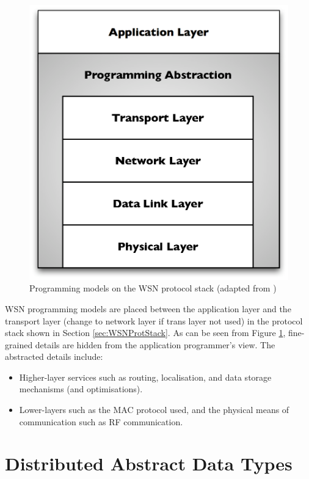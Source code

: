 \begin{figure}
\centering
\label{Fig:ProtStack_ProgAbstr}
\includegraphics[scale=0.6]{img/ProtStack_ProgAbstr.eps}\caption[Programming
models on the WSN protocol stack]{Programming models on the WSN protocol
stack (adapted from \cite{mottola_middleware:2008})}
\end{figure}

WSN programming models are placed between the application layer and the
transport layer (change to network layer if trans layer not used) in the
protocol stack shown in Section \ref{sec:WSNProtStack}. As can be seen from
Figure \ref{Fig:ProtStack_ProgAbstr},
fine-grained details are hidden from the application programmer's view. The abstracted details
include:

\begin{itemize}
  \item Higher-layer services such as routing, localisation, and data storage
  mechanisms (and optimisations).
  \item Lower-layers such as the MAC protocol used, and the physical means of
  communication such as RF communication.
\end{itemize}


\section {Distributed Abstract Data Types} \label{sec:DADT}

